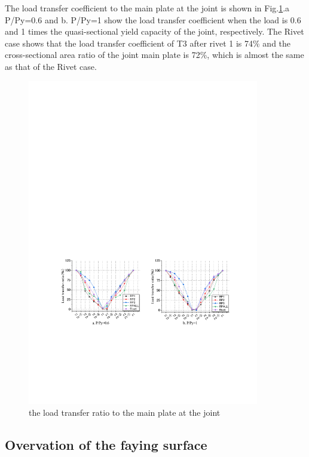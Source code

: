 The load transfer coefficient to the main plate at the joint is shown in Fig.\ref{fig3-26}.a P/Py=0.6 and b. P/Py=1 show the load transfer coefficient when the load is 0.6 and 1 times the quasi-sectional yield capacity of the joint, respectively. The Rivet case shows that the load transfer coefficient of T3 after rivet 1 is 74\% and the cross-sectional area ratio of the joint main plate is 72\%, which is almost the same as that of the Rivet case.

\begin{figure}[htbp]
    \centering
    \includegraphics[width=0.9\textwidth]{imgs/ch3/fig3-26.pdf}
    \caption{the load transfer ratio to the main plate at the joint}
    \label{fig3-26}
\end{figure}


\subsection{Overvation of the faying surface}

